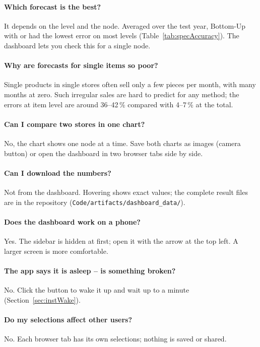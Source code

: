 \paragraph{Which forecast is the best?}
It depends on the level and the node. Averaged over the test year, Bottom-Up with  or  had the lowest error on most levels (Table~\ref{tab:specAccuracy}). The dashboard lets you check this for a single node.

\paragraph{Why are forecasts for single items so poor?}
Single products in single stores often sell only a few pieces per month, with many months at zero. Such irregular sales are hard to predict for any method; the errors at item level are around 36--42\,\% compared with 4--7\,\% at the total.

\paragraph{Can I compare two stores in one chart?}
No, the chart shows one node at a time. Save both charts as images (camera button) or open the dashboard in two browser tabs side by side.

\paragraph{Can I download the numbers?}
Not from the dashboard. Hovering shows exact values; the complete result files are in the repository (\texttt{Code/artifacts/dashboard\_data/}).

\paragraph{Does the dashboard work on a phone?}
Yes. The sidebar is hidden at first; open it with the arrow at the top left. A larger screen is more comfortable.

\paragraph{The app says it is asleep -- is something broken?}
No. Click the button to wake it up and wait up to a minute (Section~\ref{sec:instWake}).

\paragraph{Do my selections affect other users?}
No. Each browser tab has its own selections; nothing is saved or shared.

